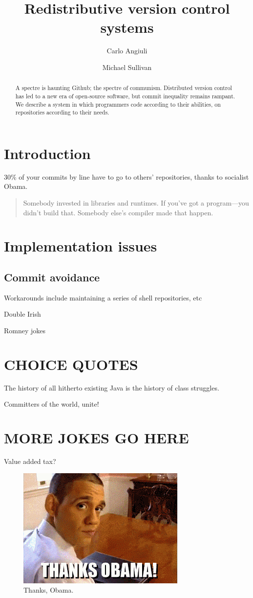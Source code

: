 \documentclass[10pt]{article}
\title{Redistributive version control systems}
\author{Carlo Angiuli \and Michael Sullivan}
\begin{document}
\maketitle

\begin{abstract}\noindent
A spectre is haunting Github; the spectre of communism. Distributed version
control has led to a new era of open-source software, but commit inequality
remains rampant. We describe a system in which programmers code according to
their abilities, on repositories according to their needs. 
\end{abstract}

\section{Introduction}

30\% of your commits by line have to go to others' repositories, thanks to
socialist Obama.

\begin{quote}
Somebody invested in libraries and runtimes. If you've got a program---you
didn't build that. Somebody else's compiler made that happen.
\end{quote}

\section{Implementation issues}

\subsection{Commit avoidance}

Workarounds include maintaining a series of shell repositories, etc

Double Irish

Romney jokes

\section{CHOICE QUOTES}

The history of all hitherto existing Java is the history of class struggles.

Committers of the world, unite!

\section{MORE JOKES GO HERE}

Value added tax?

\pagebreak
\begin{figure}
\includegraphics{thanks.png}
\caption{Thanks, Obama.}
\end{figure}

%
\end{document}

